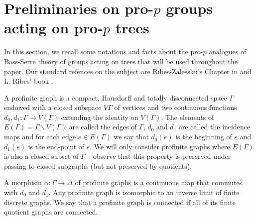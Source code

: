 \documentclass[a4paper]{amsart}
\theoremstyle{definition}
\begin{document}
\section{Preliminaries on pro-\texorpdfstring{\(p\)}{p} groups acting on pro-\texorpdfstring{\(p\)}{p} trees}\label{sec:prelim}

In this section, we recall some notations and facts about the pro-\(p\) analogues of Bass-Serre theory of groups acting on trees that will be used throughout the paper. Our standard refences on the subject are Ribes-Zalesskii's Chapter in \cite{horizons} and  L. Ribes' book \cite{ribesProfiniteGraphsGroups2017}. 

A profinite graph is a compact, Hausdorff and totally disconnected space \(\Gamma\) endowed with a closed subspace \(V\Gamma\) of vertices and two continuous functions \(d_0,d_1\colon \Gamma \to V(\Gamma)\) extending the identity on \(V(\Gamma)\). The elements of \(E(\Gamma) =\Gamma \smallsetminus V(\Gamma)\) are called the edges of \(\Gamma\), \(d_0\) and \(d_1\) are called the incidence maps and for each edge \(e \in E(\Gamma)\) we say that \(d_0(e)\) is the beginning of \(e\) and \(d_1(e)\) is the end-point of \(e\). %
We will only consider profinite graphs where \(E(\Gamma)\) is also a closed subset of \(\Gamma\) -- observe that this property is preserved under passing to closed subgraphs (but not preserved by quotients).

A morphism \(\alpha\colon \Gamma \to \Delta\) of profinite graphs is a continuous map that commutes with \(d_0\) and \(d_1\). Any profinite graph is isomorphic to an inverse limit of finite discrete graphs. We say that a profinite graph is connected if all of its finite quotient graphs are connected. 
\end{document}

